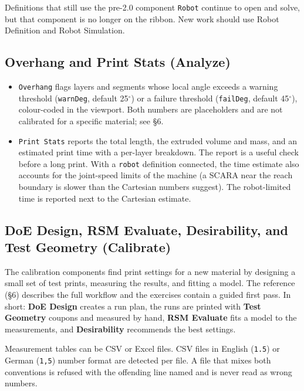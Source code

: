 \documentclass[11pt]{article}
\newcommand{\param}[1]{\texttt{#1}}
\newcommand{\iamdeg}{$^{\circ}$}
\begin{document}
Definitions that still use the pre-2.0 component \param{Robot}
continue to open and solve, but that component is no longer on the
ribbon. New work should use Robot Definition and Robot Simulation.

\subsection{Overhang and Print Stats (Analyze)}

\begin{itemize}
  \item \param{Overhang} flags layers and segments whose local angle exceeds a warning threshold (\param{warnDeg}, default 25\iamdeg) or a failure threshold (\param{failDeg}, default 45\iamdeg), colour-coded in the viewport. Both numbers are placeholders and are not calibrated for a specific material; see \S 6.
  \item \param{Print Stats} reports the total length, the extruded volume and mass, and an estimated print time with a per-layer breakdown. The report is a useful check before a long print. With a \param{robot} definition connected, the time estimate also accounts for the joint-speed limits of the machine (a SCARA near the reach boundary is slower than the Cartesian numbers suggest). The robot-limited time is reported next to the Cartesian estimate.
\end{itemize}

\subsection{DoE Design, RSM Evaluate, Desirability, and Test Geometry (Calibrate)}

The calibration components find print settings for a new material by
designing a small set of test prints, measuring the results, and
fitting a model. The reference (\S 6) describes the full workflow and
the exercises contain a guided first pass. In short: \textbf{DoE
Design} creates a run plan, the runs are printed with \textbf{Test
Geometry} coupons and measured by hand, \textbf{RSM Evaluate} fits a
model to the measurements, and \textbf{Desirability} recommends the
best settings.

Measurement tables can be CSV or Excel files. CSV files in English
(\texttt{1.5}) or German (\texttt{1,5}) number format are detected per
file. A file that mixes both conventions is refused with the offending
line named and is never read as wrong numbers.

\end{document}

